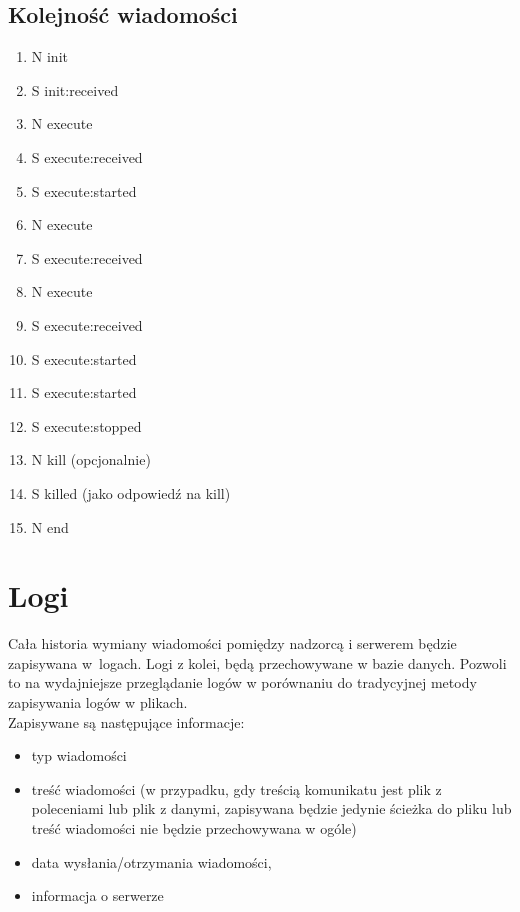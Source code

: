 \documentclass[11pt,a4paper]{article}
\begin{document}
\subsection{Kolejność wiadomości}
\begin{enumerate}
  \item N init
  \item S init:received
  \item N execute
  \item S execute:received
  \item S execute:started
  \item N execute
  \item S execute:received
  \item N execute
  \item S execute:received
  \item S execute:started
  \item S execute:started
  \item S execute:stopped
  \item N kill (opcjonalnie)
  \item S killed (jako odpowiedź na kill)
  \item N end
\end{enumerate}

\section{Logi}
Cała historia wymiany wiadomości pomiędzy nadzorcą i serwerem będzie zapisywana w~logach. Logi z kolei, będą przechowywane w bazie danych. Pozwoli to na wydajniejsze przeglądanie logów w porównaniu do tradycyjnej metody zapisywania logów w plikach.\\

Zapisywane są następujące informacje:
\begin{itemize}
  \item typ wiadomości
  \item treść wiadomości (w przypadku, gdy treścią komunikatu jest plik z poleceniami lub plik z danymi, zapisywana będzie jedynie ścieżka do pliku lub treść wiadomości nie będzie przechowywana w ogóle)
  \item data wysłania/otrzymania wiadomości,
  \item informacja o serwerze
\end{itemize}
\end{document}
